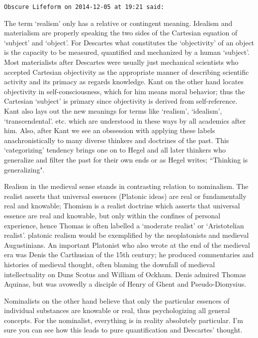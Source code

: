 \begin{footnotesize}
\begin{sffamily}
\hfill

\texttt{Obscure Lifeform on 2014-12-05 at 19:21 said: }

The term `realism' only has a relative or contingent meaning. Idealism and materialism are properly speaking the two sides of the Cartesian equation of `subject' and `object'. For Descartes what constitutes the `objectivity' of an object is the capacity to be measured, quantified and mechanized by a human `subject'. Most materialists after Descartes were usually just mechanical scientists who accepted Cartesian objectivity as the appropriate manner of describing scientific activity and its primacy as regards knowledge. Kant on the other hand locates objectivity in self-consciousness, which for him means moral behavior; thus the Cartesian `subject' is primary since objectivity is derived from self-reference. Kant also lays out the new meanings for terms like `realism’, ‘idealism’, ‘transcendental'. etc. which are understood in these ways by all academics after him. Also, after Kant we see an obssession with applying these labels anachronistically to many diverse thinkers and doctrines of the past. This `categorizing' tendency brings one on to Hegel and all later thinkers who generalize and filter the past for their own ends or as Hegel writes; ``Thinking is generalizing".

Realism in the medieval sense stands in contrasting relation to nominalism. The realist asserts that universal essences (Platonic ideas) are real or fundamentally real and knowable; Thomism is a realist doctrine which asserts that universal essence are real and knowable, but only within the confines of personal experience, hence Thomas is often labelled a `moderate realist' or `Aristotelian realist'. platonic realism would be exemplified by the neoplatonists and medieval Augustinians. An important Platonist who also wrote at the end of the medieval era was Denis the Carthusian of the 15th century; he produced commentaries and histories of medieval thought, often blaming the downfall of medieval intellectuality on Duns Scotus and William of Ockham. Denis admired Thomas Aquinas, but was avowedly a disciple of Henry of Ghent and Pseudo-Dionysius. 

Nominalists on the other hand believe that only the particular essences of individual substances are knowable or real, thus psychologizing all general concepts. For the nominalist, everything is in reality absolutely particular. I'm sure you can see how this leads to pure quantification and Descartes' thought.



\end{sffamily}
\end{footnotesize}
